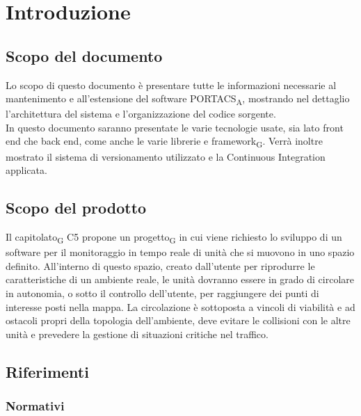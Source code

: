 \section{Introduzione}




\subsection{Scopo del documento}
Lo scopo di questo documento è presentare tutte le informazioni necessarie al mantenimento e all'estensione del software PORTACS\textsubscript{A}, mostrando nel dettaglio l'architettura del sistema e l'organizzazione del codice sorgente.\\
In questo documento saranno presentate le varie tecnologie usate, sia lato front end che back end, come anche le varie librerie e framework\textsubscript{G}. Verrà inoltre mostrato il sistema di versionamento utilizzato e la Continuous Integration applicata.





\subsection{Scopo del prodotto}

Il capitolato\textsubscript{G} C5 propone un progetto\textsubscript{G} in cui viene richiesto lo sviluppo di un software per il monitoraggio in tempo reale di unità che si muovono in uno spazio definito. All'interno di questo spazio, creato dall’utente per riprodurre le caratteristiche di un ambiente reale, le unità dovranno essere in grado di circolare in autonomia, o sotto il controllo dell’utente, per raggiungere dei punti di interesse posti nella mappa.  La circolazione è sottoposta a vincoli di viabilità e ad ostacoli propri della topologia dell’ambiente, deve evitare le collisioni con le altre unità e prevedere la gestione di situazioni critiche nel traffico.




\subsection{Riferimenti}



\subsubsection{Normativi}

